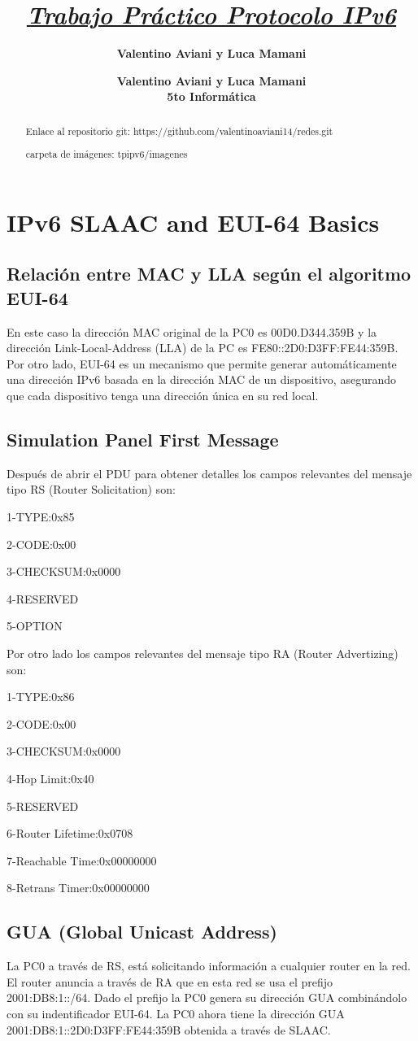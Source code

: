 \documentclass[12pt]{article}
\title{\textit{\underline{Trabajo Práctico Protocolo IPv6}}}
\author{\textbf{Valentino Aviani y Luca Mamani}}
\author{\textbf{Valentino Aviani y Luca Mamani} \\ \textbf{5to Informática}}
\begin{document}
\maketitle

\begin{abstract}
Enlace al repositorio git: https://github.com/valentinoaviani14/redes.git 

carpeta de imágenes: tpipv6/imagenes
\end{abstract}

\section{IPv6 SLAAC and EUI-64 Basics}
\subsection{Relación entre MAC y LLA según el algoritmo EUI-64}
En este caso la dirección MAC original de la PC0 es 00D0.D344.359B y la dirección Link-Local-Address (LLA) de la PC es FE80::2D0:D3FF:FE44:359B. Por otro lado, EUI-64 es un mecanismo que permite generar automáticamente una dirección IPv6 basada en la dirección MAC de un dispositivo, asegurando que cada dispositivo tenga una dirección única en su red local.
\subsection{Simulation Panel First Message}
Después de abrir el PDU para obtener detalles los campos relevantes del mensaje tipo RS (Router Solicitation) son:

1-TYPE:0x85 
 
2-CODE:0x00

3-CHECKSUM:0x0000 

4-RESERVED

5-OPTION 

Por otro lado los campos relevantes del mensaje tipo RA (Router Advertizing) son:

1-TYPE:0x86 

2-CODE:0x00

3-CHECKSUM:0x0000 

4-Hop Limit:0x40 

5-RESERVED

6-Router Lifetime:0x0708 

7-Reachable Time:0x00000000 

8-Retrans Timer:0x00000000

\subsection{GUA (Global Unicast Address)}
La PC0 a través de RS, está solicitando información a cualquier router en la red. El router anuncia a través de RA que en esta red se usa el prefijo 2001:DB8:1::/64. Dado el prefijo la PC0 genera su dirección GUA combinándolo con su indentificador EUI-64. La PC0 ahora tiene la dirección GUA 2001:DB8:1::2D0:D3FF:FE44:359B obtenida a través de SLAAC.
\end{document}
